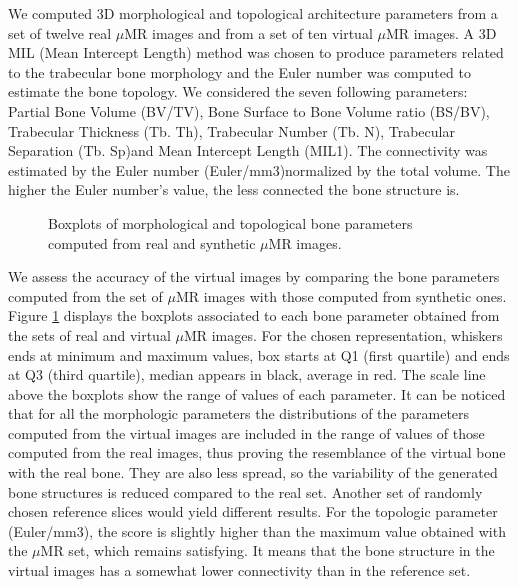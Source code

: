 \documentclass[10pt, conference]{IEEEtran}
\begin{document}
{%
We computed 3D morphological and topological architecture parameters from a set of twelve real $\mu$MR images and from a set of ten virtual $\mu$MR images. 
A 3D MIL (Mean Intercept Length) method was chosen to produce parameters related to the trabecular bone morphology and the Euler number was computed to estimate the bone topology. 
We considered the seven following parameters: Partial Bone Volume (BV/TV), Bone Surface to Bone Volume ratio (BS/BV), Trabecular Thickness (Tb. Th), Trabecular Number (Tb. N), Trabecular Separation (Tb. Sp)and Mean Intercept Length (MIL1). 
The connectivity was estimated by the Euler number (Euler/mm3)normalized by the total volume. The higher the Euler number's value, the less connected the bone structure is.

\begin{figure}
 \centering 
\caption{Boxplots of morphological and topological bone parameters computed from real and synthetic $\mu$MR images.}
 \label{fig:bone_parametres}
\end{figure}

We assess the accuracy of the virtual images by comparing the bone parameters computed from the set of 
$\mu$MR images with those computed from synthetic ones. Figure \ref{fig:bone_parametres} displays the boxplots associated to each bone parameter obtained from the sets of real and virtual $\mu$MR images. For the chosen representation, whiskers ends at minimum and maximum values, box starts at Q1 (first quartile) and ends at Q3 (third quartile), median appears in black, average in red. The scale line above the boxplots show the range of values of each parameter. It can be noticed that for all the morphologic parameters the distributions of the parameters computed from the virtual images are included in the range of values of those computed from the real images, thus proving the resemblance of the virtual bone with the real bone. They are also less spread, so the variability of the generated bone structures is reduced compared to the real set. Another set of randomly chosen reference slices would yield different results. 
For the topologic parameter (Euler/mm3), the score is slightly higher than the maximum value obtained with the $\mu$MR set, which remains satisfying. It means that the bone structure in the virtual images has a somewhat lower connectivity than in the reference set.  

}
\end{document}
